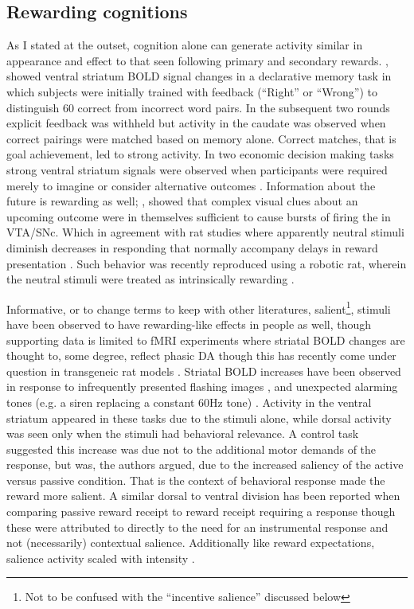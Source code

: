 \documentclass[doc,12pt]{apa}        %
\begin{document}
\subsection{Rewarding cognitions}
\label{sub:cog_rew}
As I stated at the outset, cognition alone can generate activity similar in appearance and effect to that seen following primary and secondary rewards.  , showed ventral striatum BOLD signal changes in a declarative memory task in which subjects were initially trained with feedback (``Right'' or ``Wrong'') to distinguish 60 correct from incorrect word pairs.  In the subsequent two rounds explicit feedback was withheld but activity in the caudate was observed when correct pairings were matched based on memory alone.  Correct matches, that is goal achievement, led to strong activity.  In two economic decision making tasks strong ventral striatum signals were observed when participants were required merely to imagine or consider alternative outcomes  \cite{Hayden:2009p6545, Lohrenz:2007p7240}.  Information about the future is rewarding as well; , showed that complex visual clues about an upcoming outcome were in themselves sufficient to cause bursts of firing the in VTA/SNc.  Which in agreement with rat studies where apparently neutral stimuli diminish decreases in responding that normally accompany delays in reward presentation \cite{Reed:1992p9094}.  Such behavior was recently reproduced using a robotic rat, wherein the neutral stimuli were treated as intrinsically rewarding \cite{Fiore:2008p7249}.

Informative, or to change terms to keep with other literatures, salient\footnote{
Not to be confused with the ``incentive salience'' discussed below
}, stimuli have been observed to have rewarding-like effects in people as well, though supporting data is limited to fMRI experiments where striatal BOLD changes are thought to, some degree, reflect phasic DA \cite{Schonberg:2009p6669,Surmeier:2007p4435} though this has recently come under question in transgeneic rat models \cite{Mishra:2011p9095}. Striatal BOLD increases have been observed in response to infrequently presented flashing images \cite{Zink:2003p5107}, and unexpected alarming tones (e.g. a siren replacing a constant 60Hz tone) \cite{Zink:2006p7210}.  Activity in the ventral striatum appeared in these tasks due to the stimuli alone, while dorsal activity was seen only when the stimuli had behavioral relevance.  A control task suggested this increase was due not to the additional motor demands of the response, but was, the authors argued, due to the increased saliency of the active versus passive condition.  That is the context of behavioral response made the reward more salient.  A similar dorsal to ventral division has been reported when comparing passive reward receipt to reward receipt requiring a response \cite{ODoherty:2006p2875} though these were attributed to directly to the need for an instrumental response and not (necessarily) contextual salience.  Additionally like reward expectations, salience activity scaled with intensity \cite{Zink:2006p7210}.
\end{document}
